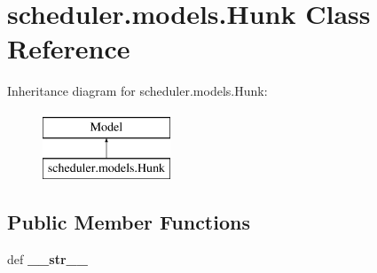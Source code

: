 \hypertarget{classscheduler_1_1models_1_1_hunk}{\section{scheduler.\-models.\-Hunk Class Reference}
\label{classscheduler_1_1models_1_1_hunk}
}
Inheritance diagram for scheduler.\-models.\-Hunk\-:\begin{figure}[H]
\begin{center}
\leavevmode
\includegraphics[height=2.000000cm]{classscheduler_1_1models_1_1_hunk}
\end{center}
\end{figure}
\subsection*{Public Member Functions}
\begin{DoxyCompactItemize}
\item 
\hypertarget{classscheduler_1_1models_1_1_hunk_a0ea2e3fef6321aa3e738390c537defde}{def {\bfseries \-\_\-\-\_\-str\-\_\-\-\_\-}}\label{classscheduler_1_1models_1_1_hunk_a0ea2e3fef6321aa3e738390c537defde}

\end{DoxyCompactItemize}

